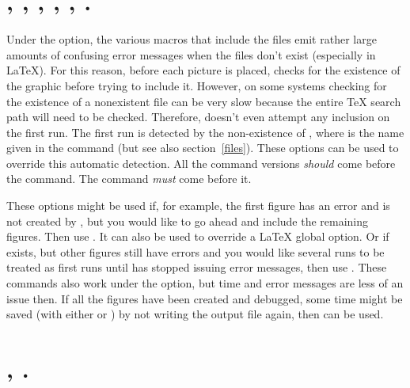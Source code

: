 \documentclass[letterpaper]{article}
\begin{document}
\section{, , , ,
    , .}\label{draft}
%
%
%
%
%

Under the  option, the various macros that include the
\EPS{} files emit rather large amounts of confusing error messages when
the files don't exist (especially in \LaTeX{}). For this reason, before
each picture is placed, \mfp{} checks for the existence of the graphic
before trying to include it. However, on some systems checking for the
existence of a nonexistent file can be very slow because the entire
\TeX{} search path will need to be checked. Therefore, \mfp{} doesn't
even attempt any inclusion on the first run. The first run is detected
by the non-existence of , where  is the
name given in the  command (but see also
section~\ref{files}). These options can be used to override this
automatic detection. All the command versions \emph{should} come before
the  command. The  command
\emph{must} come before it.

These options might be used if, for example, the first figure has an
error and is not created by \MP{}, but you would like \mfp{} to go
ahead and include the remaining figures. Then use . It can
also be used to override a \LaTeX{} global  option. Or if
 exists, but other figures still have errors and you
would like several runs to be treated as first runs until \MP{} has
stopped issuing error messages, then use .  These commands
also work under the  option, but time and error messages
are less of an issue then. If all the figures have been created and
debugged, some time might be saved (with either  or
) by not writing the output file again, then 
can be used.

\section{, .}\label{readlog}
%
\end{document}
